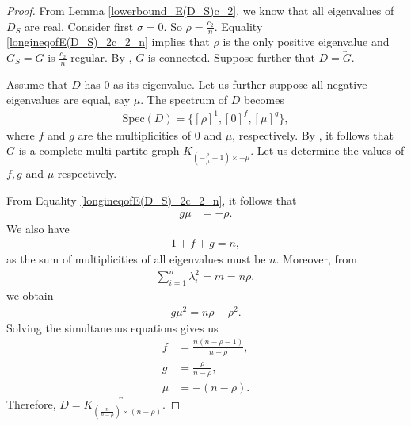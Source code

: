 \documentclass[12pt,a4paper,reqno]{amsart}
\numberwithin{equation}{section}
\theoremstyle{plain}
\theoremstyle{definition}
\newcommand{\<}{\langle}
\renewcommand{\>}{\rangle}
\begin{document}
    \begin{proof}
        From Lemma \ref{lowerbound_E(D_S)c_2}, we know that all eigenvalues of $D_S$ are real. Consider first $\sigma=0$. So $\rho=\frac{c_2}{n}$. Equality \eqref{longineqofE(D_S)_2c_2_n} implies that $\rho$ is the only positive eigenvalue and $G_S=G$ is $\frac{c_2}{n}$-regular. By \cite[Theorem 3.23]{cvetkovic1995spectra}, $G$ is connected. Suppose further that $D=\overleftrightarrow{G}$.
        
        Assume that $D$ has $0$ as its eigenvalue.
                 Let us further suppose all negative eigenvalues are equal, say $\mu$. The spectrum of $D$ becomes
                 \begin{align*}
                 \mathrm{Spec}(D) =\{[\rho]^1, [0]^f, [\mu]^g \},
                 \end{align*}
                 where $f$ and $g$ are the multiplicities of $0$ and $\mu$, respectively.
                By \cite[Theorem 6.6]{cvetkovic1995spectra}, it follows that $G$ is a complete multi-partite graph $K_{\left(-\frac{\rho}{\mu}+1\right)\times -\mu}$. Let us determine the values of $f,g$ and $\mu$ respectively.
                 
                 From Equality \eqref{longineqofE(D_S)_2c_2_n}, it follows that  
                 \begin{align*}
                  g\mu &=- \rho.
                \end{align*}
                We also have 
                \begin{align*}
                    1+f+g=n,
                \end{align*}
                as the sum of multiplicities of all eigenvalues must be $n$. Moreover, from 
                \begin{align*}
                    \sum_{i=1}^n \lambda_i^2=m=n\rho,
                \end{align*}
                we obtain 
                \begin{align*}
                    g\mu^2=n\rho-\rho^2.
                \end{align*}
                Solving the simultaneous equations gives us 
                \begin{align*}
                    f &= \frac{n(n-\rho-1)}{n-\rho} ,\\
                    g &=\frac{\rho}{n-\rho}, \\
                    \mu &= -(n-\rho). 
                \end{align*}
        Therefore, $D=\overleftrightarrow{K_{(\frac{n}{n-\rho}) \times (n-\rho)}}$. 


\end{proof}
\end{document}
